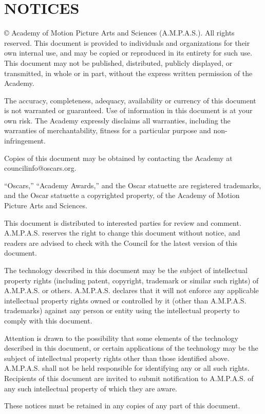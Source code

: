 \prelimsectionformat	%
\chapter[Notices]{\uppercase{Notices}}

\copyright\the\year{} Academy of Motion Picture Arts and Sciences (A.M.P.A.S.). All rights reserved. This document is provided to individuals and organizations for their own internal use, and may be copied or reproduced in its entirety for such use. This document may not be published, distributed, publicly displayed, or transmitted, in whole or in part, without the express written permission of the Academy.

The accuracy, completeness, adequacy, availability or currency of this document is not warranted or guaranteed. Use of information in this document is at your own risk. The Academy expressly disclaims all warranties, including the warranties of merchantability, fitness for a particular purpose and non-infringement.

Copies of this document may be obtained by contacting the Academy at councilinfo@oscars.org.

``Oscars,'' ``Academy Awards,'' and the Oscar statuette are registered trademarks, and the Oscar statuette a copyrighted property, of the Academy of Motion Picture Arts and Sciences.

This document is distributed to interested parties for review and comment. A.M.P.A.S. reserves the right to change this document without notice, and readers are advised to check with the Council for the latest version of this document.

The technology described in this document may be the subject of intellectual property rights (including patent, copyright, trademark or similar such rights) of A.M.P.A.S. or others. A.M.P.A.S. declares that it will not enforce any applicable intellectual property rights owned or controlled by it (other than A.M.P.A.S. trademarks) against any person or entity using the intellectual property to comply with this document.

Attention is drawn to the possibility that some elements of the technology described in this document, or certain applications of the technology may be the subject of intellectual property rights other than those identified above. A.M.P.A.S. shall not be held responsible for identifying any or all such rights. Recipients of this document are invited to submit notification to A.M.P.A.S. of any such intellectual property of which they are aware.

\vspace{10pt}
These notices must be retained in any copies of any part of this document.